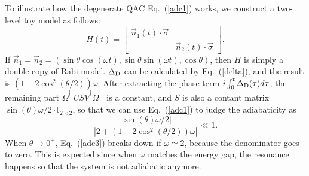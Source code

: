 \documentclass[aps,pra,twocolumn,groupedaddress,10pt]{revtex4}
\begin{document}
\begin{widetext}
To illustrate how the degenerate QAC Eq.~(\ref{adc1}) works, we construct
a two-level toy model as follows:
\begin{equation}
H(t) = \left[ \begin{matrix}
	\vec{n}_1(t)\cdot \vec{\sigma} & \\
	                          & \vec{n}_2(t)\cdot \vec{\sigma}
\end{matrix}\right].
\end{equation}
If $\vec{n}_1 = \vec{n}_2 = (\sin\theta\cos(\omega t), \sin\theta\sin(\omega t), \cos \theta)$,
then $H$ is simply a double copy of Rabi model.
$\Delta_{\rm{D}}$ can be calculated by Eq.~(\ref{delta}),
and the result is $(1-2\cos^2(\theta/2))\omega$.
After extracting the phase term $i\int_0^t \Delta_{\rm{D}}(\tau)d\tau$,
the remaining part $\bar{\Omega}_+^\dag \bar{U}S\bar{V}^\dag \bar{\Omega}_-$
is a constant, and $S$ is also a contant matrix $\sin(\theta)\omega/2\cdot \mathbb{I}_{2\times 2}$,
so that we can use Eq.~(\ref{adc1}) to judge
the adiabaticity as
\begin{equation}
	\frac{|\sin(\theta)\omega/2|}{|2+(1-2\cos^2(\theta/2))\omega|} \ll 1.
\label{adc3}
\end{equation}
When $\theta \to 0^+$, Eq.~(\ref{adc3}) breaks down if $\omega \simeq 2$, because the denominator goes to zero. This is expected since when $\omega$ matches the energy gap, the resonance happens so that the system is not adiabatic anymore.



\end{widetext}
\end{document}

